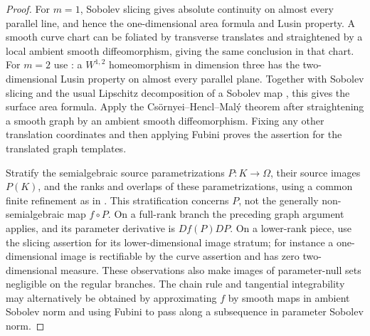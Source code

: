 \begin{proof}
For $m=1$, Sobolev slicing gives absolute continuity on almost every
parallel line, and hence the one-dimensional area formula and Lusin
property.  A smooth curve chart can be foliated by transverse
translates and straightened by a local ambient smooth diffeomorphism,
giving the same conclusion in that chart.  For $m=2$ use
\cite[Theorem~1.3]{CsornyeiHenclMaly2010}: a $W^{1,2}$ homeomorphism
in dimension three has the two-dimensional Lusin property on almost
every parallel plane.  Together with Sobolev slicing and the usual
Lipschitz decomposition of a Sobolev map
\cite[Theorem~3(1)]{BojarskiHajlasz1993}, this gives the surface area
formula. Apply the Cs\"ornyei--Hencl--Mal\'y theorem after straightening a smooth graph
by an ambient smooth diffeomorphism.  Fixing any other translation
coordinates and then applying Fubini proves the assertion for the
translated graph templates.

Stratify the semialgebraic source parametrizations $P:K\to\Omega$,
their source images $P(K)$, and the ranks and overlaps of these
parametrizations, using a common finite refinement as in
\cite[Proposition~2.3 and Lemma~2.5]{HardtLambrechtsTurchinVolic2011}.
This stratification concerns $P$, not the generally non-semialgebraic
map $f\circ P$. On a full-rank branch the preceding graph argument applies,
and its parameter derivative is $Df(P)DP$.  On a lower-rank piece,
use the slicing assertion for its lower-dimensional image stratum;
for instance a one-dimensional image is rectifiable by the curve
assertion and has zero two-dimensional measure.  These observations
also make images of parameter-null sets negligible on the regular
branches.  The chain rule and tangential integrability may alternatively
be obtained by approximating $f$ by smooth maps in ambient Sobolev norm
and using Fubini to pass along a subsequence in parameter Sobolev norm.


\end{proof}
